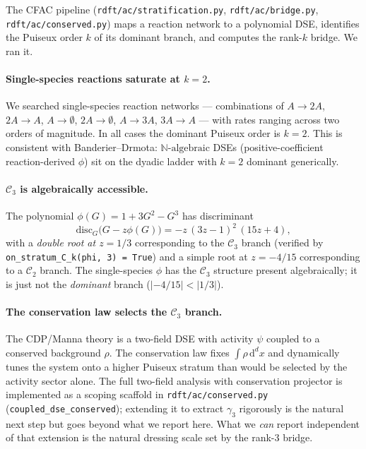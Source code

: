 \documentclass[10pt,a4paper,twocolumn]{article}
\theoremstyle{plain}
\theoremstyle{definition}
\newcommand{\dd}{\mathrm{d}}
\newcommand{\Cstr}[1]{\mathcal{C}_{#1}}
\newcommand{\Nalg}{\mathbb{N}\text{-algebraic}}
\begin{document}
The CFAC pipeline (\texttt{rdft/ac/stratification.py},
\texttt{rdft/ac/bridge.py}, \texttt{rdft/ac/conserved.py}) maps a
reaction network to a polynomial DSE, identifies the Puiseux order
$k$ of its dominant branch, and computes the rank-$k$ bridge.  We
ran it.

\paragraph{Single-species reactions saturate at $k=2$.}
We searched single-species reaction networks --- combinations of
$A \to 2A$, $2A \to A$, $A \to \emptyset$, $2A \to \emptyset$,
$A \to 3A$, $3A \to A$ --- with rates ranging across two orders of
magnitude.  In all cases the dominant Puiseux order is $k=2$.  This
is consistent with Banderier--Drmota: $\Nalg$ DSEs (positive-coefficient
reaction-derived $\phi$) sit on the dyadic ladder with $k=2$ dominant
generically.

\paragraph{$\Cstr{3}$ is algebraically accessible.}
The polynomial $\phi(G) = 1 + 3G^2 - G^3$ has discriminant
\begin{equation}\label{eq:disc_C3}
  \mathrm{disc}_G\bigl(G - z\phi(G)\bigr) = -z\,(3z-1)^2\,(15z+4),
\end{equation}
with a \emph{double root at $z = 1/3$} corresponding to the $\Cstr{3}$
branch (verified by \texttt{on\_stratum\_C\_k(phi, 3) = True}) and a
simple root at $z = -4/15$ corresponding to a $\Cstr{2}$ branch.
The single-species $\phi$ has the $\Cstr{3}$ structure present
algebraically; it is just not the \emph{dominant} branch
($|{-4/15}| < |1/3|$).

\paragraph{The conservation law selects the $\Cstr{3}$ branch.}
The CDP/Manna theory is a two-field DSE with activity $\psi$ coupled
to a conserved background $\rho$.  The conservation law fixes
$\int \rho\,\dd^d x$ and dynamically tunes the system onto a higher
Puiseux stratum than would be selected by the activity sector alone.
The full two-field analysis with conservation projector is
implemented as a scoping scaffold in
\texttt{rdft/ac/conserved.py} (\texttt{coupled\_dse\_conserved});
extending it to extract $\gamma_3$ rigorously is the natural next
step but goes beyond what we report here.  What we \emph{can}
report independent of that extension is the natural dressing scale
set by the rank-3 bridge.
\end{document}
